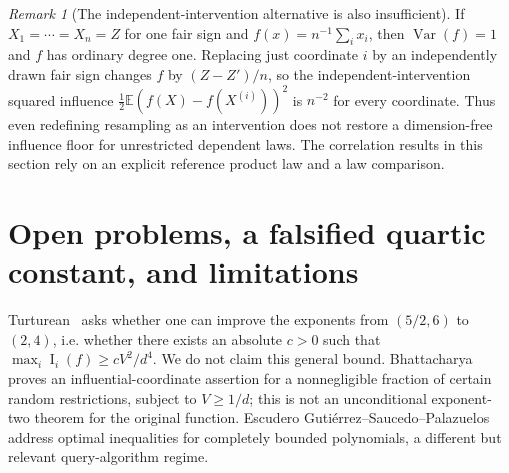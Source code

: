 \documentclass[11pt]{article}
\numberwithin{equation}{section}
\theoremstyle{remark}
\newtheorem{remark}[theorem]{Remark}
\newcommand{\Inf}{\operatorname{I}}
\begin{document}
\begin{remark}[The independent-intervention alternative is also insufficient]
If $X_1=\cdots=X_n=Z$ for one fair sign and
$f(x)=n^{-1}\sum_i x_i$, then $\operatorname{Var}(f)=1$ and
$f$ has ordinary degree one. Replacing just coordinate $i$
by an independently drawn fair sign changes $f$ by
$(Z-Z')/n$, so the independent-intervention squared influence
$\frac12\mathbb E(f(X)-f(X^{(i)}))^2$ is $n^{-2}$ for every
coordinate. Thus even redefining resampling as an intervention
does not restore a dimension-free influence floor for unrestricted
dependent laws. The correlation results in this section rely on
an explicit reference product law and a law comparison.
\end{remark}

\section{Open problems, a falsified quartic constant, and limitations}\label{sec:open}
Turturean~\cite[Section~9.5]{Tur26} asks whether one can improve the exponents from $(5/2,6)$ to $(2,4)$, i.e. whether there exists an absolute $c>0$ such that $\max_i\Inf_i(f)\ge cV^2/d^4$. We do not claim this general bound. Bhattacharya~\cite[Theorem~5]{Bha24} proves an influential-coordinate assertion for a nonnegligible fraction of certain random restrictions, subject to $V\ge1/d$; this is not an unconditional exponent-two theorem for the original function. Escudero Guti\'errez--Saucedo--Palazuelos~\cite{ESP26} address optimal inequalities for completely bounded polynomials, a different but relevant query-algorithm regime.
\end{document}
